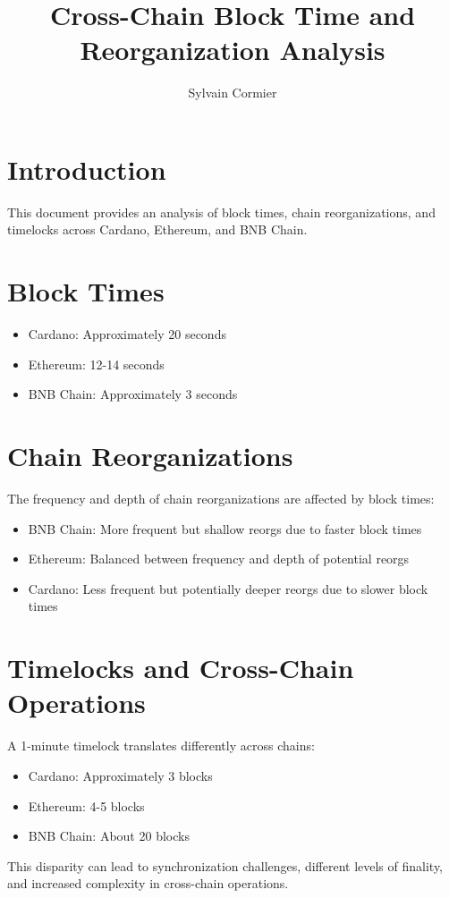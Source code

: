 \documentclass{article}
\title{Cross-Chain Block Time and Reorganization Analysis}
\author{Sylvain Cormier}
\date{}
\begin{document}
	
	\maketitle
	
	\section{Introduction}
	This document provides an analysis of block times, chain reorganizations, and timelocks across Cardano, Ethereum, and BNB Chain.
	
	\section{Block Times}
	\begin{itemize}
		\item Cardano: Approximately 20 seconds
		\item Ethereum: 12-14 seconds
		\item BNB Chain: Approximately 3 seconds
	\end{itemize}
	
	\section{Chain Reorganizations}
	The frequency and depth of chain reorganizations are affected by block times:
	\begin{itemize}
		\item BNB Chain: More frequent but shallow reorgs due to faster block times
		\item Ethereum: Balanced between frequency and depth of potential reorgs
		\item Cardano: Less frequent but potentially deeper reorgs due to slower block times
	\end{itemize}
	
	\section{Timelocks and Cross-Chain Operations}
	A 1-minute timelock translates differently across chains:
	\begin{itemize}
		\item Cardano: Approximately 3 blocks
		\item Ethereum: 4-5 blocks
		\item BNB Chain: About 20 blocks
	\end{itemize}
	
	This disparity can lead to synchronization challenges, different levels of finality, and increased complexity in cross-chain operations.
	
\end{document}
